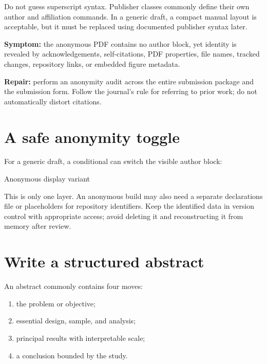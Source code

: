 Do not guess superscript syntax. Publisher classes commonly define their own
author and affiliation commands. In a generic draft, a compact manual layout is
acceptable, but it must be replaced using documented publisher syntax later.

\begin{commonerror}
\textbf{Symptom:} the anonymous PDF contains no author block, yet identity is
revealed by acknowledgements, self-citations, PDF properties, file names, tracked
changes, repository links, or embedded figure metadata.

\textbf{Repair:} perform an anonymity audit across the entire submission
package and the submission form. Follow the journal's rule for referring to
prior work; do not automatically distort citations.
\end{commonerror}

\section{A safe anonymity toggle}

For a generic draft, a conditional can switch the visible author block:

\begin{latexcode}{Anonymous display variant}
\newif\ifanonymous
\anonymoustrue %

\ifanonymous
  \author{Anonymous author(s)}
\else
  \author{[Authors and affiliations]}
\fi
\end{latexcode}

This is only one layer. An anonymous build may also need a separate declarations
file or placeholders for repository identifiers. Keep the identified data in
version control with appropriate access; avoid deleting it and reconstructing
it from memory after review.

\section{Write a structured abstract}

An abstract commonly contains four moves:

\begin{enumerate}
  \item the problem or objective;
  \item essential design, sample, and analysis;
  \item principal results with interpretable scale;
  \item a conclusion bounded by the study.
\end{enumerate}

